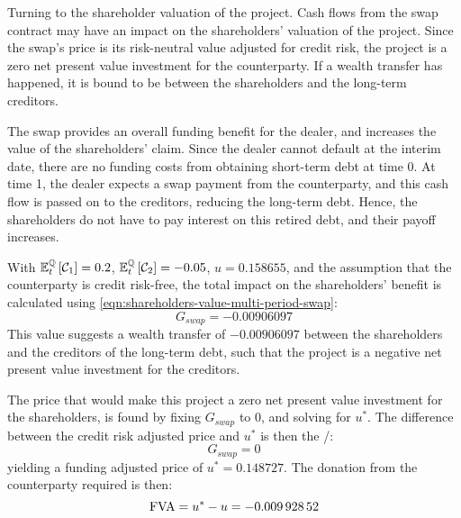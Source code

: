 \documentclass[main.tex]{subfiles}
\begin{document}
            Turning to the shareholder valuation of the project.
            Cash flows from the swap contract may have an impact on the shareholders' valuation of the project.
            Since the swap's price is its risk-neutral value adjusted for credit risk,
            the project is a zero net present value investment for the counterparty.
            If a wealth transfer has happened, it is bound to be between the shareholders and the long-term creditors.

            The swap provides an overall funding benefit for the dealer,
            and increases the value of the shareholders' claim.
            Since the dealer cannot default at the interim date,
            there are no funding costs from obtaining short-term debt at time 0.
            At time 1, the dealer expects a swap payment from the counterparty,
            and this cash flow is passed on to the creditors, reducing the long-term debt.
            Hence, the shareholders do not have to pay interest on this retired debt,
            and their payoff increases.
            
            With $\mathbb{E}_{t}^{\mathbb{Q}}\left[\mathcal{C}_1\right]=\num{0.2}$,
            $\mathbb{E}_{t}^{\mathbb{Q}}\left[\mathcal{C}_2\right]=\num{-0.05}$,
            $u=\num{0.158655}$,
            and the assumption that the counterparty is credit risk-free,
            the total impact on the shareholders' benefit is calculated using \cref{eqn:shareholders-value-multi-period-swap}:
            \begin{equation}
                G_{swap} = \num{-0.00906097}
            \end{equation}
            This value suggests a wealth transfer of $\num{-0.00906097}$
            between the shareholders and the creditors of the long-term debt,
            such that the project is a negative net present value investment for the creditors.

            The price that would make this project a zero net present value investment for the shareholders,
            is found by fixing $G_{swap}$ to 0,
            and solving for $u^{\ast}$.
            The difference between the credit risk adjusted price and $u^{\ast}$ is then the \FVA/:
            \begin{equation}
                G_{swap} = 0
            \end{equation}
            yielding a funding adjusted price of $u^{\ast} = \num{0.148727}$.
            The donation from the counterparty required is then:
            \begin{equation}
                \FVA/ = u^{\ast} - u = \num{-0.00992852}
            \end{equation}
\end{document}
